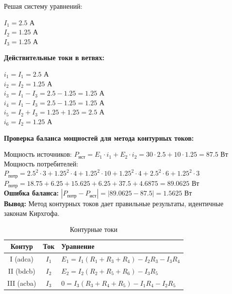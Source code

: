 Решая систему уравнений:
\begin{flushleft}
$I_1 = 2.5$ А \\
$I_2 = 1.25$ А \\
$I_3 = 1.25$ А
\end{flushleft}

\textbf{Действительные токи в ветвях:}
\begin{flushleft}
$i_1 = I_1 = 2.5$ А \\
$i_2 = I_2 = 1.25$ А \\
$i_3 = I_1 - I_3 = 2.5 - 1.25 = 1.25$ А \\
$i_4 = I_1 - I_3 = 2.5 - 1.25 = 1.25$ А \\
$i_5 = I_2 + I_3 = 1.25 + 1.25 = 2.5$ А \\
$i_6 = I_2 = 1.25$ А
\end{flushleft}

\textbf{Проверка баланса мощностей для метода контурных токов:}
\begin{flushleft}
Мощность источников: $P_{\text{ист}} = E_1 \cdot i_1 + E_2 \cdot i_2 = 30 \cdot 2.5 + 10 \cdot 1.25 = 87.5$ Вт \\
Мощность потребителей: $P_{\text{потр}} = 2.5^2 \cdot 3 + 1.25^2 \cdot 4 + 1.25^2 \cdot 10 + 1.25^2 \cdot 4 + 2.5^2 \cdot 6 + 1.25^2 \cdot 3$ \\
$P_{\text{потр}} = 18.75 + 6.25 + 15.625 + 6.25 + 37.5 + 4.6875 = 89.0625$ Вт \\
\textbf{Ошибка баланса:} $|P_{\text{потр}} - P_{\text{ист}}| = |89.0625 - 87.5| = 1.5625$ Вт \\
\textbf{Вывод:} Метод контурных токов дает правильные результаты, идентичные законам Кирхгофа.
\end{flushleft}

\begin{table}[H]
\centering
\begin{tabular}{|c|c|l|}
\hline
\textbf{Контур} & \textbf{Ток} & \textbf{Уравнение} \\
\hline
I (adca) & $I_1$ & $E_1 = I_1(R_1+R_3+R_4) - I_2R_3 - I_3R_4$ \\
\hline
II (bdcb) & $I_2$ & $E_2 = I_2(R_2+R_5+R_6) - I_3R_5$ \\
\hline
III (acba) & $I_3$ & $0 = I_3(R_3+R_4+R_5) - I_1R_4 - I_2R_5$ \\
\hline
\end{tabular}
\caption{Контурные токи}
\label{tab:loop_current_equations}
\end{table}

